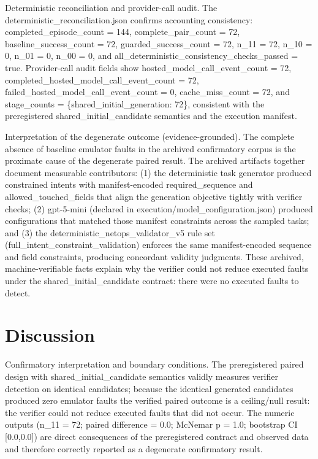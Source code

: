 \documentclass[conference]{IEEEtran}
\begin{document}
Deterministic reconciliation and provider-call audit. The deterministic\_reconciliation.json confirms accounting consistency: completed\_episode\_count = 144, complete\_pair\_count = 72, baseline\_success\_count = 72, guarded\_success\_count = 72, n\_11 = 72, n\_10 = 0, n\_01 = 0, n\_00 = 0, and all\_deterministic\_consistency\_checks\_passed = true. Provider-call audit fields show hosted\_model\_call\_event\_count = 72, completed\_hosted\_model\_call\_event\_count = 72, failed\_hosted\_model\_call\_event\_count = 0, cache\_miss\_count = 72, and stage\_counts = \{shared\_initial\_generation: 72\}, consistent with the preregistered shared\_initial\_candidate semantics and the execution manifest.

Interpretation of the degenerate outcome (evidence-grounded). The complete absence of baseline emulator faults in the archived confirmatory corpus is the proximate cause of the degenerate paired result. The archived artifacts together document measurable contributors: (1) the deterministic task generator produced constrained intents with manifest-encoded required\_sequence and allowed\_touched\_fields that align the generation objective tightly with verifier checks; (2) gpt-5-mini (declared in execution/model\_configuration.json) produced configurations that matched those manifest constraints across the sampled tasks; and (3) the deterministic\_netops\_validator\_v5 rule set (full\_intent\_constraint\_validation) enforces the same manifest-encoded sequence and field constraints, producing concordant validity judgments. These archived, machine-verifiable facts explain why the verifier could not reduce executed faults under the shared\_initial\_candidate contract: there were no executed faults to detect.

\section{Discussion}
Confirmatory interpretation and boundary conditions. The preregistered paired design with shared\_initial\_candidate semantics validly measures verifier detection on identical candidates; because the identical generated candidates produced zero emulator faults the verified paired outcome is a ceiling/null result: the verifier could not reduce executed faults that did not occur. The numeric outputs (n\_11 = 72; paired difference = 0.0; McNemar p = 1.0; bootstrap CI [0.0,0.0]) are direct consequences of the preregistered contract and observed data and therefore correctly reported as a degenerate confirmatory result.
\end{document}
